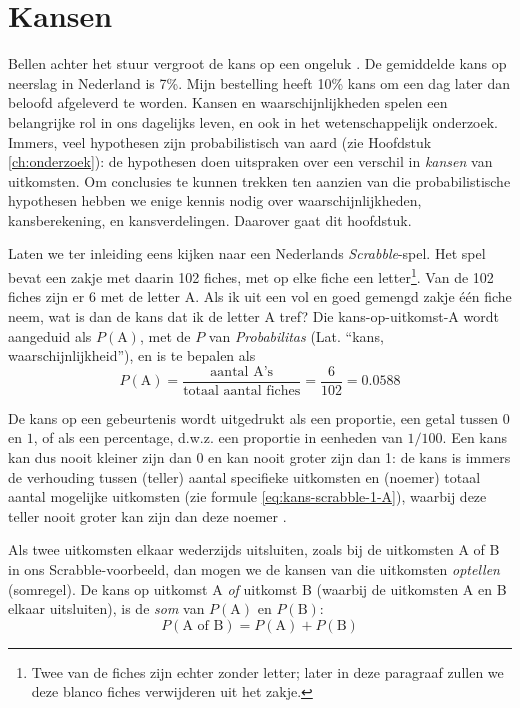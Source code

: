 \documentclass[
]{book}
\begin{document}
\hypertarget{sec:kansen}{%
\section{Kansen}\label{sec:kansen}}

Bellen achter het stuur vergroot de kans op een ongeluk \citep{Bhar13}. De
gemiddelde kans op neerslag in Nederland is 7\%. Mijn bestelling heeft
10\% kans om een dag later dan beloofd afgeleverd te worden. Kansen en
waarschijnlijkheden spelen een belangrijke rol in ons dagelijks leven,
en ook in het wetenschappelijk onderzoek. Immers, veel hypothesen zijn
probabilistisch van aard (zie Hoofdstuk \ref{ch:onderzoek}):
de hypothesen doen uitspraken over
een verschil in \emph{kansen} van uitkomsten. Om conclusies te kunnen trekken
ten aanzien van die probabilistische hypothesen hebben we enige kennis
nodig over waarschijnlijkheden, kansberekening, en kansverdelingen.
Daarover gaat dit hoofdstuk.

Laten we ter inleiding eens kijken naar een Nederlands \emph{Scrabble}-spel.
Het spel bevat een zakje met daarin 102 fiches, met op elke fiche een
letter\footnote{Twee van de fiches zijn echter zonder letter; later in deze paragraaf zullen we deze blanco fiches verwijderen uit het zakje.}. Van de 102 fiches zijn er 6 met de letter A. Als ik uit een
vol en goed gemengd zakje één fiche neem, wat is dan de kans dat ik de
letter A tref? Die kans-op-uitkomst-A wordt aangeduid als
\(P(\textrm{A})\), met de \(P\) van \emph{Probabilitas} (Lat. ``kans,
waarschijnlijkheid''), en is te bepalen als
\begin{equation}
    P(\textrm{A})=
    \frac{\textrm{aantal A's}}{\textrm{totaal aantal fiches}}= 
    \frac{6}{102} = 0.0588
  \label{eq:kans-scrabble-1-A}
\end{equation}

De kans op een gebeurtenis wordt uitgedrukt als een proportie, een getal
tussen \(0\) en \(1\), of als een percentage, d.w.z. een proportie in
eenheden van \(1/100\). Een kans kan dus nooit kleiner zijn dan \(0\) en kan
nooit groter zijn dan 1: de kans is immers de verhouding tussen (teller)
aantal specifieke uitkomsten en (noemer) totaal aantal mogelijke
uitkomsten (zie
formule \eqref{eq:kans-scrabble-1-A}), waarbij deze teller nooit groter kan
zijn dan deze noemer \citep{SK01}.

Als twee uitkomsten elkaar wederzijds uitsluiten, zoals bij de
uitkomsten A of B in ons Scrabble-voorbeeld, dan mogen we de kansen van
die uitkomsten \emph{optellen} (somregel). De kans op uitkomst A \emph{of}
uitkomst B (waarbij de uitkomsten A en B elkaar uitsluiten), is de \emph{som}
van \(P(\textrm{A})\) en \(P(\textrm{B})\):
\begin{equation}
    P(\textrm{A of B}) = P(\textrm{A}) + P(\textrm{B})
  \label{eq:kans-somregel}
\end{equation}
\end{document}
